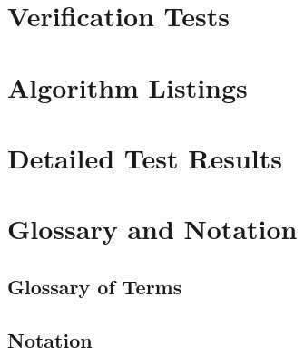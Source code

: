 \documentclass[11pt,a4paper,openany]{report}
\renewcommand{\chaptermark}[1]{\markboth{\chaptername\ \thechapter.\ #1}{}}
\begin{document}
\clearpage
\renewcommand{\bibname}{References}



\appendix
\renewcommand{\chaptermark}[1]{\markboth{\appendixname\ \thechapter.\ #1}{}}

\chapter{Verification Tests}


\chapter{Algorithm Listings}


\chapter{Detailed Test Results}


\chapter{Glossary and Notation}
\section{Glossary of Terms}


\section{Notation}

\end{document}
